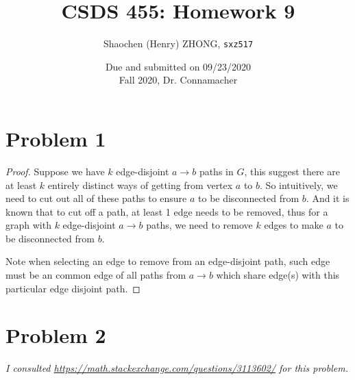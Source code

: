 \documentclass[11pt]{article}
\newcommand{\ilc}{\texttt}
\begin{document}
\title{\textbf{CSDS 455: Homework 9}}

\author{Shaochen (Henry) ZHONG, \ilc{sxz517}}
\date{Due and submitted on 09/23/2020 \\ Fall 2020, Dr. Connamacher}
\maketitle

\section*{Problem 1}

\begin{proof}
Suppose we have $k$ edge-disjoint $a \to b$ paths in $G$, this suggest there are at least $k$ entirely distinct ways of getting from vertex $a$ to $b$. So intuitively, we need to cut out all of these paths to ensure $a$ to be disconnected from $b$. And it is known that to cut off a path, at least 1 edge needs to be removed, thus for a graph with $k$ edge-disjoint $a \to b$ paths, we need to remove $k$ edges to make $a$ to be disconnected from $b$.

Note when selecting an edge to remove from an edge-disjoint path, such edge must be an common edge of all paths from $a \to b$ which share edge(s) with this particular edge disjoint path.
\end{proof}

\section*{Problem 2}

\textit{I consulted \url{https://math.stackexchange.com/questions/3113602/} for this problem.}\newline
\end{document}
